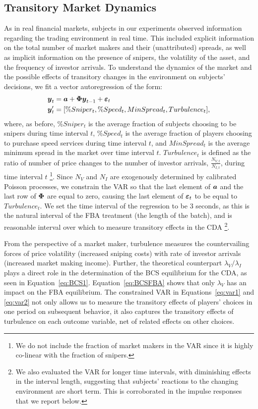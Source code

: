 \documentclass[12pt]{article}
\def\bmath#1{\mbox{\boldmath$#1$}}
\begin{document}
\subsection{Transitory Market Dynamics}

As in real financial markets, subjects in our experiments observed information regarding the trading environment in real time. This included explicit information on the total number of market makers and their (unattributed) spreads, as well as implicit information on the presence of snipers, the volatility of the asset, and the frequency of investor arrivals. To understand the dynamics of the market and the possible effects of transitory changes in the environment on subjects' decisions, we fit a vector autoregression of the form:
\begin{align}
	\bmath{y}_t & = \bmath{a} + \bmath{\Phi} \bmath{y}_{t-1} + \bmath{\varepsilon}_t \label{eq:var1} \\
    \bmath{y}_t' & = [\%Sniper_t, \%Speed_t, MinSpread_t, Turbulence_t], \label{eq:var2}
\end{align}
where, as before, $\%Sniper_t$ is the average fraction of subjects choosing to be snipers during time interval $t$, $\%Speed_t$ is the average fraction of players choosing to purchase speed services during time interval $t$, and $MinSpread_t$ is the average minimum spread in the market over time interval $t$. $Turbulence_t$ is defined as the ratio of number of price changes to the number of investor arrivals, $\frac{N_{V,t}}{N_{I,t}} $, during time interval $t$ \footnote{We do not include the fraction of market makers in the VAR since it is highly co-linear with the fraction of snipers.}. Since $N_V$ and $N_I$ are exogenously determined by calibrated Poisson processes, we constrain the VAR so that the last element of $\bmath{a}$ and the last row of $\bmath{\Phi}$ are equal to zero, causing the last element of $\bmath{\varepsilon}_t$ to be equal to $Turbulence_t$.
We set the time interval of the regression to be 3 seconds, as this is the natural interval of the FBA treatment (the length of the batch), and is reasonable interval over which to measure transitory effects in the CDA \footnote{We also evaluated the VAR for longer time intervals, with diminishing effects in the interval length, suggesting that subjects' reactions to the changing environment are short term. This is corroborated in the impulse responses that we report below.}.

From the perspective of a market maker, turbulence measures the countervailing forces of price volatility (increased sniping costs) with rate of investor arrivals (increased market making income). Further, the theoretical counterpart $\lambda_V/\lambda_{I}$ plays a direct role in the determination of the BCS equilibrium for the CDA, as seen in Equation~\eqref{eq:BCS1}. Equation~\eqref{eq:BCSFBA} shows that only $\lambda_V$ has an impact on the FBA equilibrium. The constrained VAR in Equations~\eqref{eq:var1} and \eqref{eq:var2} not only allows us to measure the transitory effects of players' choices in one period on subsequent behavior, it also captures the transitory effects of turbulence on each outcome variable, net of related effects on other choices.
\end{document}
